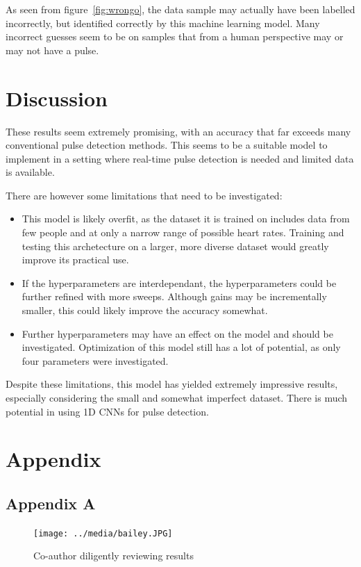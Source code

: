 \documentclass{article}
\begin{document}
As seen from figure~\ref{fig:wrongo}, the data sample may actually have been labelled incorrectly, but identified correctly by this machine learning model. Many incorrect guesses seem to be on samples that from a human perspective may or may not have a pulse.

\section{Discussion}

These results seem extremely promising, with an accuracy that far exceeds many conventional pulse detection methods. This seems to be a suitable model to implement in a setting where real-time pulse detection is needed and limited data is available. 

There are however some limitations that need to be investigated:
\begin{itemize}

    \item This model is likely overfit, as the dataset it is trained on includes data from few people and at only a narrow range of possible heart rates. Training and testing this archetecture on a larger, more diverse dataset would greatly improve its practical use.
    \item If the hyperparameters are interdependant, the hyperparameters could be further refined with more sweeps. Although gains may be incrementally smaller, this could likely improve the accuracy somewhat. 
    \item Further hyperparameters may have an effect on the model and should be investigated. Optimization of this model still has a lot of potential, as only four parameters were investigated.
    
\end{itemize}

Despite these limitations, this model has yielded extremely impressive results, especially considering the small and somewhat imperfect dataset. There is much potential in using 1D CNNs for pulse detection.

\section{Appendix}

\subsection{Appendix A}

\begin{figure}[H]
    \centering
    \texttt{[image: ../media/bailey.JPG]}
    \caption{Co-author diligently reviewing results}
    \label{fig:bailey}
\end{figure}
\end{document}
